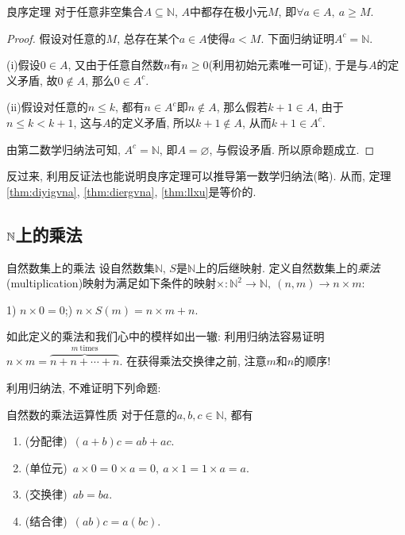 \begin{theorem}{良序定理} \label{thm:llxu}
	对于任意非空集合$A \subseteq \mathbb{N}$, $A$中都存在极小元$M$, 即$\forall a \in A, ~a \geq M$.
\end{theorem}
\begin{proof}
	假设对任意的$M$, 总存在某个$a \in A$使得$a < M$. 下面归纳证明$A^c = \mathbb{N}$. 
	
	(i)假设$0 \in A$, 又由于任意自然数$n$有$n \geq 0$(利用初始元素唯一可证), 于是与$A$的定义矛盾, 故$0 \notin A$, 那么$0 \in A^c$. 
	
	(ii)假设对任意的$n \leq k$, 都有$n \in A^c$即$n \notin A$, 那么假若$k+1 \in A$, 由于$n \leq k < k+1$, 这与$A$的定义矛盾, 所以$k+1 \notin A$, 从而$k+1 \in A^c$. 
	
	由第二数学归纳法可知, $A^c = \mathbb{N}$, 即$A = \varnothing$, 与假设矛盾. 所以原命题成立.
\end{proof}

反过来, 利用反证法也能说明良序定理可以推导第一数学归纳法(略). 从而, 定理\ref{thm:diyigvna}, \ref{thm:diergvna}, \ref{thm:llxu}是等价的.

\subsection{$\mathbb{N}$上的乘法}

\begin{definition}{自然数集上的乘法}
	设自然数集$\mathbb{N}$, $S$是$\mathbb{N}$上的后继映射. 定义自然数集上的\textit{乘法}(multiplication)映射为满足如下条件的映射$\times : \mathbb{N}^2 \to \mathbb{N}, ~(n, m) \to n \times m$: 
	
	1) $n\times 0=0$;) $n\times S(m)=n\times m+n$.
\end{definition}

如此定义的乘法和我们心中的模样如出一辙: 利用归纳法容易证明$n \times m = \overbrace{n+n+\cdots +n}^{m~ \text{times}}$. 在获得乘法交换律之前, 注意$m$和$n$的顺序! 

利用归纳法, 不难证明下列命题: 

\begin{proposition}{自然数的乘法运算性质}
	对于任意的$a, b, c \in \mathbb{N}$, 都有
	\begin{enumerate}
		\item (分配律)~$(a+b)c = ab+ac$.
		\item (单位元)~$a \times 0 = 0 \times a = 0, ~a \times 1 = 1 \times a = a$.
		\item (交换律)~$ab=ba$.
		\item (结合律)~$(ab)c=a(bc)$.
	\end{enumerate}
\end{proposition}

